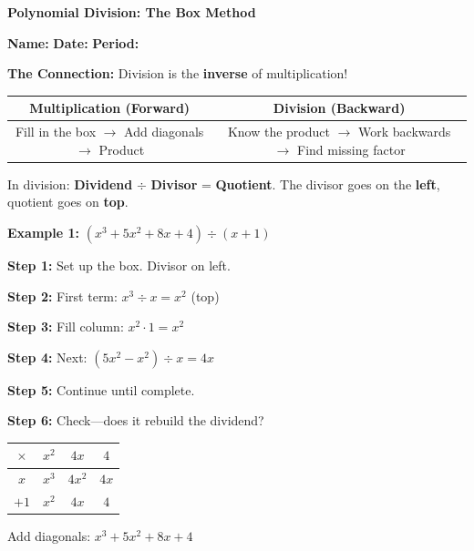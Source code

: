 \documentclass[11pt]{article}
\begin{document}
\begin{center}
    \Large\textbf{Polynomial Division: The Box Method}
\end{center}
\vspace{0.1cm}
\textbf{Name:} \underline{\hspace{2.2in}} \textbf{Date:} \underline{\hspace{0.8in}} \textbf{Period:} \underline{\hspace{0.4in}}

\vspace{0.15cm}

\begin{tcolorbox}[colback=gray!15, colframe=black, boxrule=0.5pt, arc=3pt, left=4pt, right=4pt, top=3pt, bottom=3pt]
\textbf{The Connection:} Division is the \textbf{inverse} of multiplication!

\begin{center}
\begin{tabular}{c|c}
\textbf{Multiplication (Forward)} & \textbf{Division (Backward)} \\
\hline
Fill in the box $\rightarrow$ Add diagonals $\rightarrow$ Product & Know the product $\rightarrow$ Work backwards $\rightarrow$ Find missing factor
\end{tabular}
\end{center}
\vspace{-0.1cm}
In division: \textbf{Dividend} $\div$ \textbf{Divisor} = \textbf{Quotient}. The divisor goes on the \textbf{left}, quotient goes on \textbf{top}.
\end{tcolorbox}

\vspace{0.15cm}

\textbf{Example 1:} $(x^3 + 5x^2 + 8x + 4) \div (x + 1)$

\vspace{0.1cm}
\begin{minipage}[t]{0.48\textwidth}
\textbf{Step 1:} Set up the box. Divisor on left.

\textbf{Step 2:} First term: $x^3 \div x = x^2$ (top)

\textbf{Step 3:} Fill column: $x^2 \cdot 1 = x^2$

\textbf{Step 4:} Next: $(5x^2 - x^2) \div x = 4x$

\textbf{Step 5:} Continue until complete.

\textbf{Step 6:} Check---does it rebuild the dividend?
\end{minipage}
\hfill
\begin{minipage}[t]{0.48\textwidth}
\centering
\renewcommand{\arraystretch}{1.4}
\begin{tabular}{|c||c|c|c|}
\hline
$\times$ & $x^2$ & $4x$ & $4$ \\
\hline\hline
$x$ & $x^3$ & $4x^2$ & $4x$ \\
\hline
$+1$ & $x^2$ & $4x$ & $4$ \\
\hline
\end{tabular}

\vspace{0.2cm}
Add diagonals: $x^3 + 5x^2 + 8x + 4$ \checkmark
\end{minipage}
\end{document}
